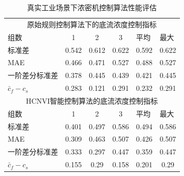 \begin{table}[b]
  \centering
  \caption{真实工业场景下浓密机控制算法性能评估}
    \begin{tabular}{lccccc}
    \toprule
    \multicolumn{6}{c}{原始规则控制算法下的底流浓度控制指标} \\
    \multicolumn{1}{l}{组数} & 1     & 2     & 3     & \multicolumn{1}{l}{平均} & \multicolumn{1}{l}{最大} \\
    \hline
    \multicolumn{1}{l}{标准差} & 0.542 & 0.612 & 0.622 & 0.592 & 0.622 \\
    \multicolumn{1}{l}{MAE} & 0.466 & 0.471 & 0.527 & 0.488 & 0.527 \\
    \multicolumn{1}{l}{一阶差分标准差} & 0.378 & 0.445 & 0.439 & 0.421 & 0.445 \\
    $\bar{c}_{f}-{c}_{s}$   & 0.283 & 0.121 & 0.291 & 0.232 & 0.291 \\
    \midrule
    \multicolumn{6}{c}{HCNVI智能控制算法的底流浓度控制指标} \\
    \multicolumn{1}{l}{组数} & 1     & 2     & 3     & \multicolumn{1}{l}{平均} & \multicolumn{1}{l}{最大} \\
    \hline
    \multicolumn{1}{l}{标准差} & 0.401 & 0.497 & 0.586 & 0.494 & 0.586 \\
    \multicolumn{1}{l}{MAE} & 0.309 & 0.463 & 0.507 & 0.426 & 0.507 \\
    \multicolumn{1}{l}{一阶差分标准差} & 0.333 & 0.297 & 0.447 & 0.359 & 0.447 \\
    $\bar{c}_{f}-{c}_{s}$     & 0.155 & 0.29  & 0.158 & 0.201 & 0.29 \\
    \bottomrule
    \end{tabular}%
  \label{tab:industrial_thickening_eval}%
\end{table}%
